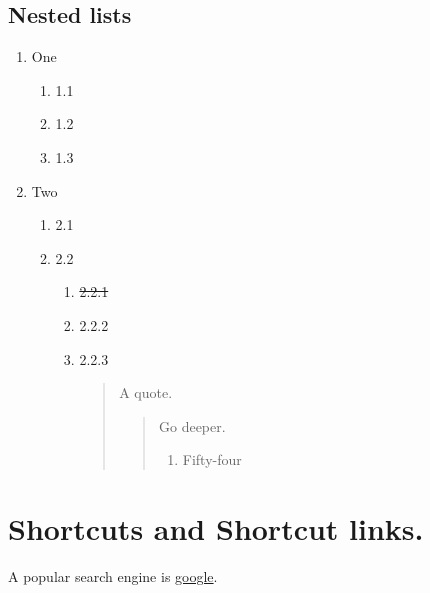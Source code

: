 \subsection{\label{ordered-nested-lists}Nested lists}
\begin{enumerate}
\item
\par One
\begin{enumerate}
\item
\par 1.1
\item
\par 1.2
\item
\par 1.3
\end{enumerate}

\par
\item
\par Two
\begin{enumerate}
\item
\par 2.1
\item
\par 2.2
\begin{enumerate}
\item
\par \st{2.2.1}
\item
\par 2.2.2
\item
\par 2.2.3
\begin{quote}
\par A quote.
\begin{quote}
\par Go deeper.
\begin{enumerate}
\item
\par Fifty-four
\end{enumerate}

\end{quote}

\end{quote}

\end{enumerate}

\end{enumerate}

\end{enumerate}

\section{\label{shortcuts-and-shortcut-links}Shortcuts and Shortcut links.}
\par A popular search engine is \href{https://www.google.com}{google}.

